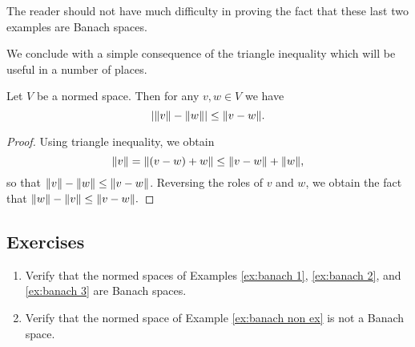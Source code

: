 The reader should not have much difficulty in proving the fact that these last two examples are Banach spaces.

We conclude with a simple consequence of the triangle inequality which will be useful in a number of places.

\begin{proposition}
Let $V$ be a normed space. Then for any $v,w\in V$ we have \[|\norm{v}-\norm{w}|\leq\norm{v-w}.\]
\end{proposition}

\begin{proof}
Using triangle inequality, we obtain \[\norm{v}=\norm{(v-w)+w}\leq\norm{v-w}+\norm{w},\] so that $\norm{v}-\norm{w}\leq\norm{v-w}$. Reversing the roles of $v$ and $w$, we obtain the fact that $\norm{w}-\norm{v}\leq\norm{v-w}.$
\end{proof}

\subsection*{Exercises}
\begin{enumerate}[label=\arabic*)]
    \item Verify that the normed spaces of Examples \ref{ex:banach 1}, \ref{ex:banach 2}, and \ref{ex:banach 3} are Banach spaces.
    \item Verify that the normed space of Example \ref{ex:banach non ex} is not a Banach space.
\end{enumerate}